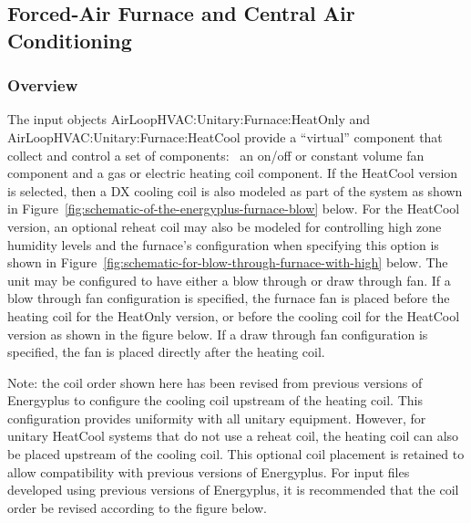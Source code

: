 \subsection{Forced-Air Furnace and Central Air Conditioning}\label{forced-air-furnace-and-central-air-conditioning}

\subsubsection{Overview}\label{overview-1}

The input objects AirLoopHVAC:Unitary:Furnace:HeatOnly and AirLoopHVAC:Unitary:Furnace:HeatCool provide a ``virtual'' component that collect and control a set of components:~ an on/off or constant volume fan component and a gas or electric heating coil component. If the HeatCool version is selected, then a DX cooling coil is also modeled as part of the system as shown in Figure~\ref{fig:schematic-of-the-energyplus-furnace-blow} below. For the HeatCool version, an optional reheat coil may also be modeled for controlling high zone humidity levels and the furnace's configuration when specifying this option is shown in Figure~\ref{fig:schematic-for-blow-through-furnace-with-high} below. The unit may be configured to have either a blow through or draw through fan. If a blow through fan configuration is specified, the furnace fan is placed before the heating coil for the HeatOnly version, or before the cooling coil for the HeatCool version as shown in the figure below. If a draw through fan configuration is specified, the fan is placed directly after the heating coil.

Note: the coil order shown here has been revised from previous versions of Energyplus to configure the cooling coil upstream of the heating coil. This configuration provides uniformity with all unitary equipment. However, for unitary HeatCool systems that do not use a reheat coil, the heating coil can also be placed upstream of the cooling coil. This optional coil placement is retained to allow compatibility with previous versions of Energyplus. For input files developed using previous versions of Energyplus, it is recommended that the coil order be revised according to the figure below.

